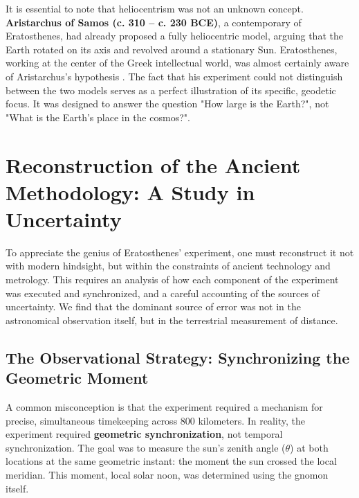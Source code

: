 \documentclass[11pt]{article}
\begin{document}
It is essential to note that heliocentrism was not an unknown concept. \textbf{Aristarchus of Samos (c. 310 – c. 230 BCE)}, a contemporary of Eratosthenes, had already proposed a fully heliocentric model, arguing that the Earth rotated on its axis and revolved around a stationary Sun. Eratosthenes, working at the center of the Greek intellectual world, was almost certainly aware of Aristarchus's hypothesis \cite{Heath1913}. The fact that his experiment could not distinguish between the two models serves as a perfect illustration of its specific, geodetic focus. It was designed to answer the question "How large is the Earth?", not "What is the Earth's place in the cosmos?".



\section{Reconstruction of the Ancient Methodology: A Study in Uncertainty}

To appreciate the genius of Eratosthenes' experiment, one must reconstruct it not with modern hindsight, but within the constraints of ancient technology and metrology. This requires an analysis of how each component of the experiment was executed and synchronized, and a careful accounting of the sources of uncertainty. We find that the dominant source of error was not in the astronomical observation itself, but in the terrestrial measurement of distance.

\subsection{The Observational Strategy: Synchronizing the Geometric Moment}

A common misconception is that the experiment required a mechanism for precise, simultaneous timekeeping across 800 kilometers. In reality, the experiment required \textbf{geometric synchronization}, not temporal synchronization. The goal was to measure the sun's zenith angle ($\theta$) at both locations at the same geometric instant: the moment the sun crossed the local meridian. This moment, local solar noon, was determined using the gnomon itself.
\end{document}

